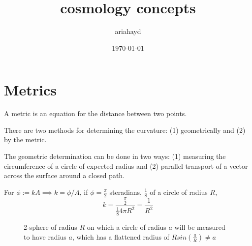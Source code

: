 \documentclass{paper}
\title{cosmology concepts}
\author{ariahayd}
\date{\today}
\begin{document}
 

\setlength{\fboxsep}{0pt}
\setlength{\fboxrule}{0pt}

\maketitle

\section{Metrics} 
  A metric is an equation for the distance between two points.

  There are two methods for determining the curvature: (1) geometrically and
  (2) by the metric.

  The geometric determination can be done in two ways: (1) measuring the 
  circumference of a circle of expected radius and (2) parallel transport of 
  a vector across the surface around a closed path.

  For \( \phi := k A \implies k = \phi / A \), if \( \phi = \frac{\pi}{2} \) 
  steradians, \( \frac{1}{8} \) of a circle of radius 
  \( R \), 
  \[ k = \frac{\frac{\pi}{2}}{\frac{1}{8} 4 \pi R^2 } = \frac{1}{R^2} \]

  \begin{figure}[!hbt]
    \begin{center}
    \end{center}

      \caption{2-sphere of radius \(R\) on which a circle of radius \(a\)
        will be measured to have radius \(a\), which has a flattened radius
        of \(R sin \left( \frac{a}{R} \right) \neq a\)}
      \label{fig:sphere}
  \end{figure}
\end{document}
